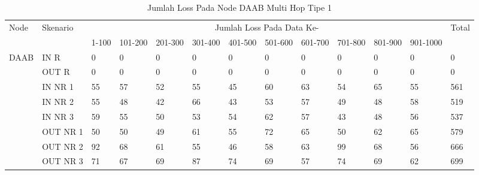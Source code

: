 \begin{table}[H]
  \centering
  \caption{Jumlah Loss Pada Node DAAB Multi Hop Tipe 1}
    \begin{tabular}{|p{1cm}|p{1.9cm}|p{0.6cm}|p{0.6cm}|p{0.6cm}|p{0.6cm}|p{0.6cm}|p{0.6cm}|p{0.6cm}|p{0.6cm}|p{0.6cm}|p{0.6cm}|p{1cm}|}
    \hline
        \multirow{2}{*}{Node}&\multirow{2}{*}{Skenario}&\multicolumn{10}{|c|}{Jumlah Loss Pada Data Ke-}&\multirow{2}{*}{Total} \\\cline{3-12}
          & & 1-100 & 101-200 & 201-300 & 301-400 & 401-500 & 501-600 & 601-700 & 701-800 & 801-900 & 901-1000 & \\
        \hline
    \multirow{8}{*}{DAAB}
          & IN R  & 0     & 0     & 0     & 0     & 0     & 0     & 0     & 0     & 0     & 0     & 0 \\
          & OUT R & 0     & 0     & 0     & 0     & 0     & 0     & 0     & 0     & 0     & 0     & 0 \\
          & IN NR 1 & 55    & 57    & 52    & 55    & 45    & 60    & 63    & 54    & 65    & 55    & 561 \\
          & IN NR 2 & 55    & 48    & 42    & 66    & 43    & 53    & 57    & 49    & 48    & 58    & 519 \\
          & IN NR 3 & 59    & 55    & 50    & 53    & 54    & 62    & 57    & 43    & 48    & 56    & 537 \\
          & OUT NR 1 & 50    & 50    & 49    & 61    & 55    & 72    & 65    & 50    & 62    & 65    & 579 \\
          & OUT NR 2 & 92    & 68    & 61    & 55    & 46    & 58    & 63    & 99    & 68    & 56    & 666 \\
          & OUT NR 3 & 71    & 67    & 69    & 87    & 74    & 69    & 57    & 74    & 69    & 62    & 699 \\
    \hline
    \end{tabular}%
  \label{tab:addlabel}%
\end{table}%

